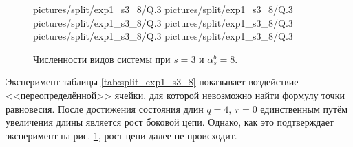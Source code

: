 \begin{figure}[H]
    \centering
       {pictures/split/exp1_s3_8/Q}{.3}
      {pictures/split/exp1_s3_8/Q}{.3}
      {pictures/split/exp1_s3_8/Q}{.3}
      {pictures/split/exp1_s3_8/Q}{.3}
      {pictures/split/exp1_s3_8/Q}{.3}
     {pictures/split/exp1_s3_8/Q}{.3}
\caption{Численности видов системы при \(s=3\) и \(\alpha^b_s = 8\).} \label{fig:split_exp1_s3_8}
\end{figure}
Эксперимент таблицы \ref{tab:split_exp1_s3_8} показывает воздействие <<переопределённой>> ячейки, для которой невозможно найти формулу точки равновесия. После достижения состояния длин \(q=4, ~ r=0\) единственным путём увеличения длины является рост боковой цепи. Однако, как это подтверждает эксперимент на рис. \ref{fig:split_exp1_s3_8}, рост цепи далее не происходит.

